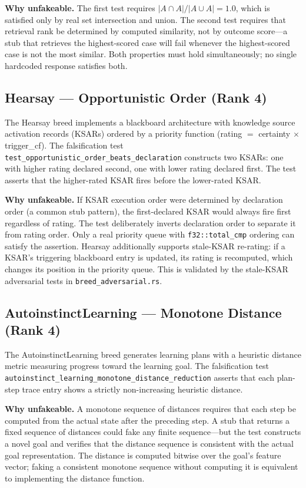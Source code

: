 \textbf{Why unfakeable.} The first test requires $|A \cap A| / |A \cup A| = 1.0$, which is
satisfied only by real set intersection and union. The second test requires that retrieval rank
be determined by computed similarity, not by outcome score---a stub that retrieves the highest-scored
case will fail whenever the highest-scored case is not the most similar. Both properties must
hold simultaneously; no single hardcoded response satisfies both.

\subsection{Hearsay --- Opportunistic Order (Rank 4)}
\label{subsec:hearsay-oracle}

The Hearsay breed implements a blackboard architecture with knowledge source activation records
(KSARs) ordered by a priority function (rating $=$ certainty $\times$ trigger\_cf). The
falsification test \texttt{test\_opportunistic\_order\_beats\_declaration} constructs two KSARs:
one with higher rating declared second, one with lower rating declared first. The test asserts
that the higher-rated KSAR fires before the lower-rated KSAR.

\textbf{Why unfakeable.} If KSAR execution order were determined by declaration order (a common
stub pattern), the first-declared KSAR would always fire first regardless of rating. The test
deliberately inverts declaration order to separate it from rating order. Only a real priority
queue with \texttt{f32::total\_cmp} ordering can satisfy the assertion. Hearsay additionally
supports stale-KSAR re-rating: if a KSAR's triggering blackboard entry is updated, its rating
is recomputed, which changes its position in the priority queue. This is validated by the
stale-KSAR adversarial tests in \texttt{breed\_adversarial.rs}.

\subsection{AutoinstinctLearning --- Monotone Distance (Rank 4)}
\label{subsec:autoinstinct-learning-oracle}

The AutoinstinctLearning breed generates learning plans with a heuristic distance metric
measuring progress toward the learning goal. The falsification test
\texttt{autoinstinct\_learning\_monotone\_distance\_reduction} asserts that each plan-step
trace entry shows a strictly non-increasing heuristic distance.

\textbf{Why unfakeable.} A monotone sequence of distances requires that each step be computed
from the actual state after the preceding step. A stub that returns a fixed sequence of
distances could fake any finite sequence---but the test constructs a novel goal and verifies
that the distance sequence is consistent with the actual goal representation. The distance is
computed bitwise over the goal's feature vector; faking a consistent monotone sequence without
computing it is equivalent to implementing the distance function.


